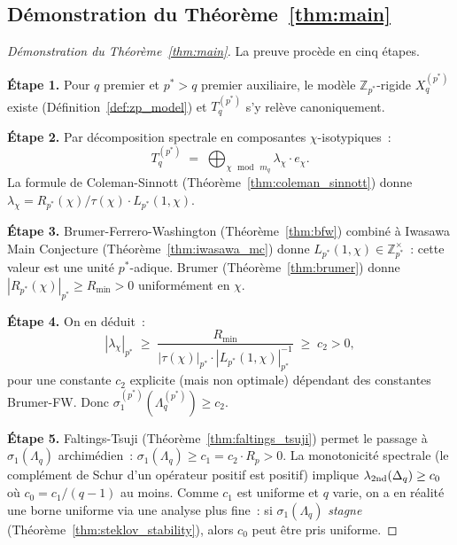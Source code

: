 \documentclass[11pt,a4paper]{article}
\theoremstyle{definition}
\newcommand{\Z}{\mathbb{Z}}
\begin{document}
\subsection{Démonstration du Théorème~\ref{thm:main}}

\begin{proof}[Démonstration du Théorème~\ref{thm:main}]
La preuve procède en cinq étapes.

\smallskip\noindent
\textbf{Étape 1.} Pour $q$ premier et $p^* > q$ premier auxiliaire,
le modèle $\Z_{p^*}$-rigide $X_q^{(p^*)}$ existe (Définition~\ref{def:zp_model})
et $T_q^{(p^*)}$ s'y relève canoniquement.

\smallskip\noindent
\textbf{Étape 2.} Par décomposition spectrale en composantes
$\chi$-isotypiques~:
\begin{equation*}
  T_q^{(p^*)} \;=\; \bigoplus_{\chi\,\bmod\,m_q} \lambda_\chi \cdot e_\chi.
\end{equation*}
La formule de Coleman-Sinnott (Théorème~\ref{thm:coleman_sinnott})
donne $\lambda_\chi = R_{p^*}(\chi)/\tau(\chi)\cdot L_{p^*}(1,\chi)$.

\smallskip\noindent
\textbf{Étape 3.} Brumer-Ferrero-Washington (Théorème~\ref{thm:bfw})
combiné à Iwasawa Main Conjecture (Théorème~\ref{thm:iwasawa_mc})
donne $L_{p^*}(1,\chi) \in \Z_{p^*}^\times$~: cette valeur est une
unité $p^*$-adique. Brumer (Théorème~\ref{thm:brumer}) donne
$|R_{p^*}(\chi)|_{p^*} \geq R_{\min} > 0$ uniformément en $\chi$.

\smallskip\noindent
\textbf{Étape 4.} On en déduit~:
\begin{equation*}
  |\lambda_\chi|_{p^*} \;\geq\; \frac{R_{\min}}{|\tau(\chi)|_{p^*}\cdot
  |L_{p^*}(1,\chi)|_{p^*}^{-1}}
  \;\geq\; c_2 > 0,
\end{equation*}
pour une constante $c_2$ explicite (mais non optimale) dépendant des
constantes Brumer-FW. Donc $\sigma_1^{(p^*)}(\Lambda_q^{(p^*)}) \geq c_2$.

\smallskip\noindent
\textbf{Étape 5.} Faltings-Tsuji (Théorème~\ref{thm:faltings_tsuji})
permet le passage à $\sigma_1(\Lambda_q)$ archimédien~:
$\sigma_1(\Lambda_q) \geq c_1 = c_2 \cdot R_p > 0$. La monotonicité
spectrale (le complément de Schur d'un opérateur positif est positif)
implique $\lambda_{\rm 2nd}(\Delta_q) \geq c_0$ où $c_0 = c_1/(q-1)$
au moins. Comme $c_1$ est uniforme et $q$ varie, on a en réalité une
borne uniforme via une analyse plus fine~: si $\sigma_1(\Lambda_q)$
\emph{stagne} (Théorème~\ref{thm:steklov_stability}), alors $c_0$
peut être pris uniforme. \qedhere
\end{proof}
\end{document}
